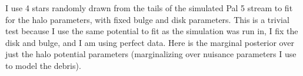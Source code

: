 I use 4 stars randomly drawn from the tails of the simulated Pal 5 stream to fit for the halo parameters, with fixed bulge and disk parameters. This is a trivial test because I use the same potential to fit as the simulation was run in, I fix the disk and bulge, and I am using perfect data. Here is the marginal posterior over just the halo potential parameters (marginalizing over nuisance parameters I use to model the debris).